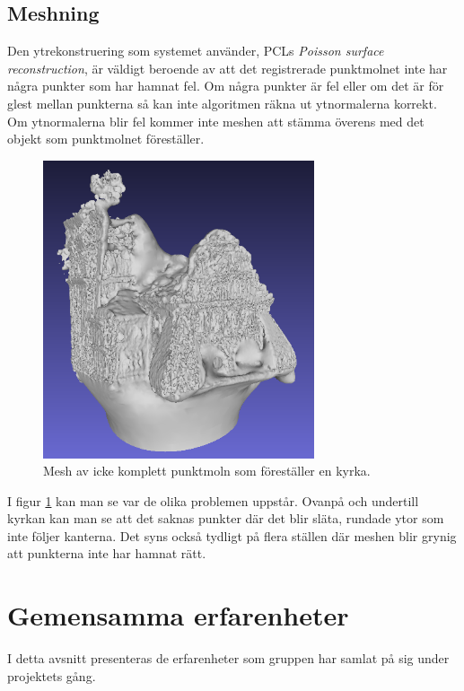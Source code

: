 \subsection{Meshning}
Den ytrekonstruering som systemet använder, PCLs \textit{Poisson surface reconstruction}, är väldigt beroende av att det registrerade punktmolnet inte har några punkter som har hamnat fel. Om några punkter är fel eller om det är för glest mellan punkterna så kan inte algoritmen räkna ut ytnormalerna korrekt. Om ytnormalerna blir fel kommer inte meshen att stämma överens med det objekt som punktmolnet föreställer.

\begin{figure}[H]
	\centering
	\includegraphics[width=80mm]{figures/3DCopyMeshChurch.PNG}
	\caption{Mesh av icke komplett punktmoln som föreställer en kyrka.}
	\label{fig:3dcopy_mesh_church}
\end{figure}
\label{cha:results_experiences}

I figur \ref{fig:3dcopy_mesh_church} kan man se var de olika problemen uppstår. Ovanpå och undertill kyrkan kan man se att det saknas punkter där det blir släta, rundade ytor som inte följer kanterna. Det syns också tydligt på flera ställen där meshen blir grynig att punkterna inte har hamnat rätt.

\section{Gemensamma erfarenheter}

I detta avsnitt presenteras de erfarenheter som gruppen har samlat på sig under projektets gång.


